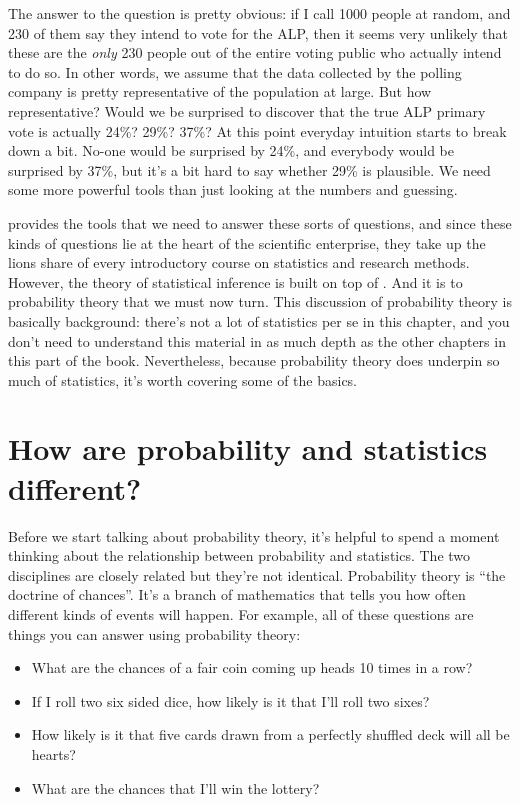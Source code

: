 The answer to the question is pretty obvious: if I call 1000 people at random, and 230 of them say they intend to vote for the ALP, then it seems very unlikely that these are the {\it only} 230 people out of the entire voting public who actually intend to do so. In other words, we assume that the data collected by the polling company is pretty representative of the population at large. But how representative? Would we be surprised to discover that the true ALP primary vote is actually 24\%? 29\%? 37\%? At this point everyday intuition starts to break down a bit. No-one would be surprised by 24\%, and everybody would be surprised by 37\%, but it's a bit hard to say whether 29\% is plausible. We need some more powerful tools than just looking at the numbers and guessing.

 provides the tools that we need to answer these sorts of questions, and since these kinds of questions lie at the heart of the scientific enterprise, they take up the lions share of every introductory course on statistics and research methods. However, the theory of statistical inference is built on top of . And it is to probability theory that we must now turn. This discussion of probability theory is basically background: there's not a lot of statistics per se in this chapter, and you don't need to understand this material in as much depth as the other chapters in this part of the book. Nevertheless, because probability theory does underpin so much of statistics, it's worth covering some of the basics. 


\section{How are probability and statistics different?~\label{sec:probstats}}

Before we start talking about probability theory, it's helpful to spend a moment thinking about the relationship between probability and statistics. The two disciplines are closely related but they're not identical. Probability theory is ``the doctrine of chances''. It's a branch of mathematics that tells you how often different kinds of events will happen. For example, all of these questions are things you can answer using probability theory:

\begin{itemize} \itemsep -2pt
\item What are the chances of a fair coin coming up heads 10 times in a row?
\item If I roll two six sided dice, how likely is it that I'll roll two sixes?
\item How likely is it that five cards drawn from a perfectly shuffled deck will all be hearts?
\item What are the chances that I'll win the lottery?
\end{itemize}

